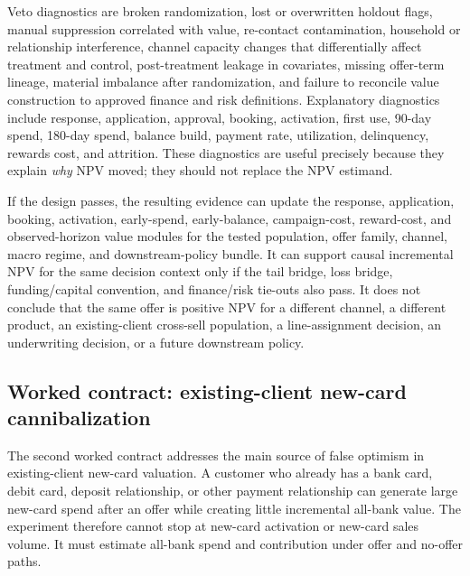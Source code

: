 \documentclass[11pt]{article}
\newcommand{\1}{\mathbf{1}}
\begin{document}
Veto diagnostics are broken randomization, lost or overwritten holdout flags,
manual suppression correlated with value, re-contact contamination, household
or relationship interference, channel capacity changes that differentially
affect treatment and control, post-treatment leakage in covariates, missing
offer-term lineage, material imbalance after randomization, and failure to
reconcile value construction to approved finance and risk definitions.
Explanatory diagnostics include response, application, approval, booking,
activation, first use, 90-day spend, 180-day spend, balance build, payment
rate, utilization, delinquency, rewards cost, and attrition. These diagnostics
are useful precisely because they explain \emph{why} NPV moved; they should
not replace the NPV estimand.

If the design passes, the resulting evidence can update the response,
application, booking, activation, early-spend, early-balance, campaign-cost,
reward-cost, and observed-horizon value modules for the tested population,
offer family, channel, macro regime, and downstream-policy bundle. It can
support causal incremental NPV for the same decision context only if the tail
bridge, loss bridge, funding/capital convention, and finance/risk tie-outs also
pass. It does not conclude that the same offer is positive NPV for a different
channel, a different product, an existing-client cross-sell population, a
line-assignment decision, an underwriting decision, or a future downstream
policy.

\subsection{Worked contract: existing-client new-card cannibalization}
\label{subsec:worked-cannibalization-contract}

The second worked contract addresses the main source of false optimism in
existing-client new-card valuation. A customer who already has a bank card,
debit card, deposit relationship, or other payment relationship can generate
large new-card spend after an offer while creating little incremental
all-bank value. The experiment therefore cannot stop at new-card activation or
new-card sales volume. It must estimate all-bank spend and contribution under
offer and no-offer paths.
\end{document}
